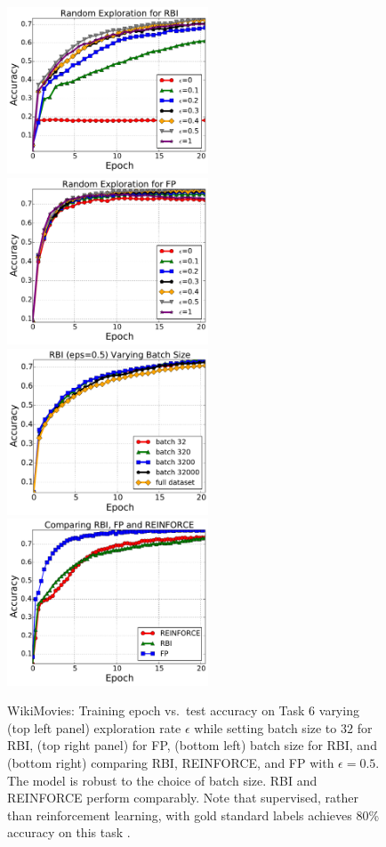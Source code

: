 \begin{figure}[!t]
\center
\includegraphics[width=2.35in]{img/RBI6.pdf}
\includegraphics[width=2.35in]{img/FP6.pdf}\\
\includegraphics[width=2.35in]{img/batch_RBI_task6.pdf}
\includegraphics[width=2.35in]{img/comparison6.pdf}\\
\caption[Training epoch vs.\ test accuracy on Task $6$ varying exploration rate $\epsilon$]{ WikiMovies: Training epoch vs.\ test accuracy on Task $6$ varying (top left panel) exploration rate $\epsilon$ while setting batch size to $32$ for RBI,
(top right panel) for FP,
(bottom left) batch size for RBI, and (bottom right) comparing RBI, REINFORCE, and FP
  with $\epsilon=0.5$. %
The model is robust to the choice of batch size. RBI and REINFORCE perform comparably.
Note that supervised, rather than reinforcement learning, with gold standard labels
achieves 80\% accuracy on this task \citep{weston2016dialog}.
\label{fig:online-movieqa-task6}
}
\end{figure}


